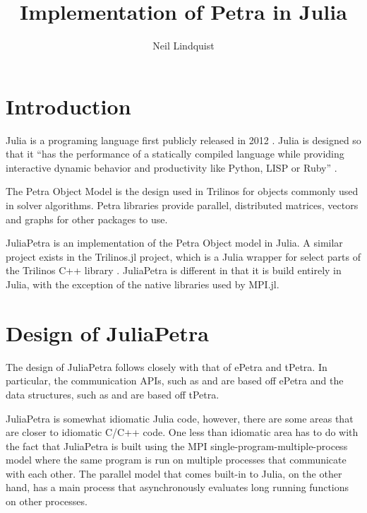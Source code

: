 \documentclass[acmsmall]{acmart}
\title{Implementation of Petra in Julia}
\author{Neil Lindquist}
\newcommand{\juliaSnippet}[1]{\texttt{\detokenize{#1}}}
\begin{document}
\maketitle

\section{Introduction}

Julia is a programing language first publicly released in 2012 \cite{WhyWeCreatedJulia}.
Julia is designed so that it
``has the performance of a statically compiled
language while providing interactive dynamic behavior and productivity like Python, LISP or
Ruby'' \cite{JuliaDesignPaper}.

The Petra Object Model is the design used in Trilinos for objects commonly used in solver algorithms.
\cite{OverviewOfTrilinos}
Petra libraries provide parallel, distributed matrices, vectors and graphs for other packages to use.

JuliaPetra is an implementation of the Petra Object model in Julia.
A similar project exists in the Trilinos.jl project, which is a Julia wrapper for select parts of
the Trilinos C++ library \cite{Trilinos.jlGithub}.
JuliaPetra is different in that it is build entirely in Julia, with the exception of the
native libraries used by MPI.jl.


\section{Design of JuliaPetra}

The design of JuliaPetra follows closely with that of ePetra and tPetra.
In particular, the communication APIs, such as \juliaSnippet{Comm} and \juliaSnippet{BlockMap}
are based off ePetra and the data structures, such as \juliaSnippet{MultiVector} and
\juliaSnippet{RowMatrix} are based off tPetra.


JuliaPetra is somewhat idiomatic Julia code, however, there are some areas that are closer to
idiomatic C/C++ code.
One less than idiomatic area has to do with the fact that JuliaPetra is built using the MPI
single-program-multiple-process model where the same program is run on multiple processes
that communicate with each other.
The parallel model that comes built-in to Julia, on the other hand, has a main process that
asynchronously evaluates long running functions on other processes.  \cite{JuliaFreshApproach}
\end{document}

